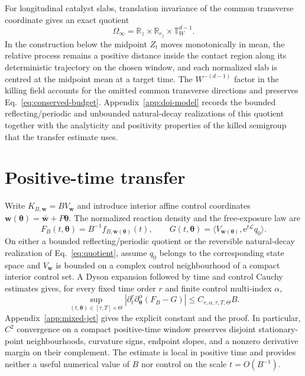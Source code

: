 \documentclass{iopjournal}
\newcommand{\e}{\mathrm e}
\theoremstyle{plain}
\theoremstyle{definition}
\begin{document}
For longitudinal catalyst slabs, translation invariance of the common
transverse coordinate gives an exact quotient
\begin{equation}
 \Omega_\infty
 =\mathbb R_z\times\mathbb R_{r_\parallel}\times
   \mathbb T_W^{d-1}.
 \label{eq:quotient}
\end{equation}
In the construction below the midpoint \(Z_t\) moves monotonically in mean,
the relative process remains a positive distance inside the contact region
along its deterministic trajectory on the chosen window, and each normalized
slab is centred at the midpoint mean at a target time.  The
\(W^{-(d-1)}\) factor in the killing field accounts for the omitted common
transverse directions and preserves Eq.~\eqref{eq:conserved-budget}.
Appendix~\ref{app:doi-model} records the bounded reflecting/periodic and
unbounded natural-decay realizations of this quotient together with the
analyticity and positivity properties of the killed semigroup that the
transfer estimate uses.

\section{Positive-time transfer}
\label{sec:transfer}

Write \(K_{B,\bm w}=BV_{\bm w}\) and introduce interior affine control
coordinates \(\bm w(\bm\theta)=\bar{\bm w}+P\bm\theta\).  The normalized
reaction density and the free-exposure law are
\begin{equation}
 F_B(t,\bm\theta)=B^{-1}f_{B,\bm w(\bm\theta)}(t),
 \qquad
 G(t,\bm\theta)=
 \langle V_{\bm w(\bm\theta)},\e^{t\mathcal L}q_0\rangle.
 \label{eq:normalized-exposure}
\end{equation}
On either a bounded reflecting/periodic quotient or the reversible
natural-decay realization of Eq.~\eqref{eq:quotient}, assume \(q_0\) belongs
to the corresponding state space and \(V_{\bm w}\) is bounded on a complex
control neighbourhood of a compact interior control set.  A
Dyson expansion followed by time and control Cauchy estimates gives, for
every fixed time order \(r\) and finite control multi-index \(\alpha\),
\begin{equation}
 \sup_{(t,\bm\theta)\in[\tau,T]\times\Theta}
 \left|
 \partial_t^r\partial_{\bm\theta}^{\alpha}(F_B-G)
 \right|
 \le C_{r,\alpha,\tau,T,\Theta}B.
 \label{eq:mixed-jet}
\end{equation}
Appendix~\ref{app:mixed-jet} gives the explicit constant and the proof.  In
particular, \(C^2\) convergence on a compact positive-time window preserves
disjoint stationary-point neighbourhoods, curvature signs, endpoint slopes,
and a nonzero derivative margin on their complement.  The estimate is local
in positive time and provides neither a useful numerical value of \(B\) nor
control on the scale \(t=O(B^{-1})\).
\end{document}
